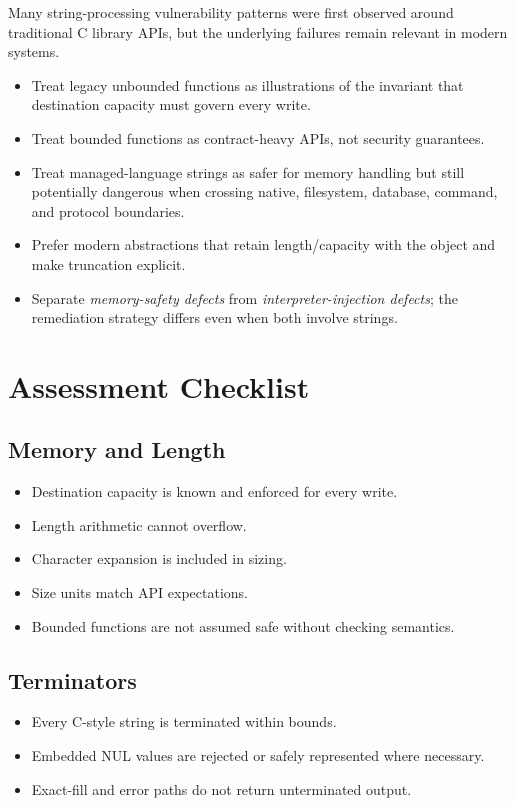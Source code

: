 \documentclass[11pt]{article}
\newcommand{\checkbox}{\(\square\)}
\begin{document}
Many string-processing vulnerability patterns were first observed around traditional C library APIs, but the underlying failures remain relevant in modern systems.

\begin{itemize}
  \item Treat legacy unbounded functions as illustrations of the invariant that destination capacity must govern every write.
  \item Treat bounded functions as contract-heavy APIs, not security guarantees.
  \item Treat managed-language strings as safer for memory handling but still potentially dangerous when crossing native, filesystem, database, command, and protocol boundaries.
  \item Prefer modern abstractions that retain length/capacity with the object and make truncation explicit.
  \item Separate \emph{memory-safety defects} from \emph{interpreter-injection defects}; the remediation strategy differs even when both involve strings.
\end{itemize}
\clearpage

\section{Assessment Checklist}

\subsection*{Memory and Length}
\begin{itemize}
  \item[\checkbox] Destination capacity is known and enforced for every write.
  \item[\checkbox] Length arithmetic cannot overflow.
  \item[\checkbox] Character expansion is included in sizing.
  \item[\checkbox] Size units match API expectations.
  \item[\checkbox] Bounded functions are not assumed safe without checking semantics.
\end{itemize}

\subsection*{Terminators}
\begin{itemize}
  \item[\checkbox] Every C-style string is terminated within bounds.
  \item[\checkbox] Embedded NUL values are rejected or safely represented where necessary.
  \item[\checkbox] Exact-fill and error paths do not return unterminated output.
\end{itemize}
\end{document}
